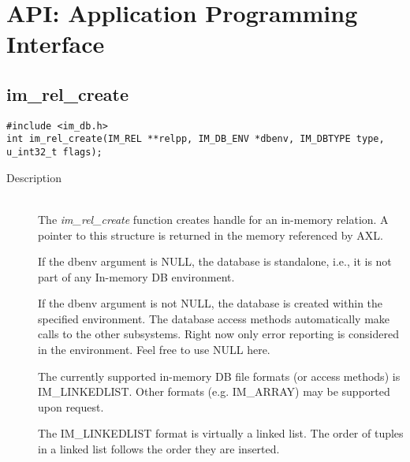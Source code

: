 \section{API: Application Programming Interface}

\subsection{im\_rel\_create}
\begin{verbatim}
#include <im_db.h>
int im_rel_create(IM_REL **relpp, IM_DB_ENV *dbenv, IM_DBTYPE type, u_int32_t flags);
\end{verbatim}
\begin{description}
\item[Description]\ \\
  The {\em im\_rel\_create} function creates handle for an in-memory
  relation.  A pointer to this structure is returned in the memory
  referenced by AXL.

  If the dbenv argument is NULL, the database is standalone, i.e., it
  is not part of any In-memory DB environment.

  If the dbenv argument is not NULL, the database is created within
  the specified environment. The database access methods automatically
  make calls to the other subsystems. Right now only error reporting
  is considered in the environment.  Feel free to use NULL here.

  The currently supported in-memory DB file formats (or access methods)
  is IM\_LINKED\-LIST.  Other formats (e.g. IM\_ARRAY) may be
  supported upon request.
  
  The IM\_LINKEDLIST format is virtually a linked list.  The order of
  tuples in a linked list follows the order they are inserted.
  

\end{description}

